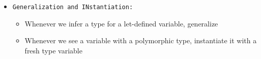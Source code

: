 \documentclass[landscape,8pt]{extarticle}
\newcommand{\code}{\lstinline}
\begin{document}
\begin{multicols}{3}
\begin{itemize}
\begin{itemize}
                        \item \code{Generalization and INstantiation:}
                        \begin{itemize}
                            \item Whenever we infer a type for a let-defined variable, generalize
                            \item Whenever we see a variable with a polymorphic type, instantiate it with a fresh type variable
                        \end{itemize}
              \end{itemize}
    \end{itemize}
\end{multicols}
\end{document}
